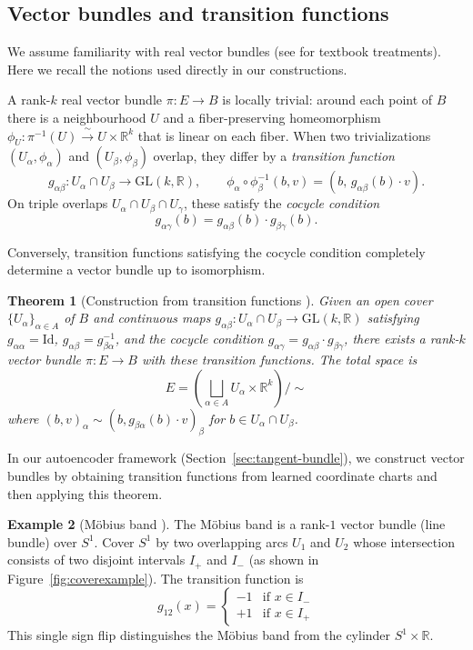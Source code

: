 \documentclass[11pt]{article}
\newcommand{\R}{\mathbb{R}}
\newcommand{\Id}{\mathrm{Id}}
\newcommand{\GL}{\mathrm{GL}}
\theoremstyle{plain}
\newtheorem{theorem}{Theorem}[section]
\theoremstyle{definition}
\newtheorem{example}[theorem]{Example}
\theoremstyle{remark}
\begin{document}
\subsection{Vector bundles and transition functions}\label{sec:vector-bundles-background}
 
We assume familiarity with real vector bundles (see \cite{milnor1974characteristic,Zakharevich2024} for textbook treatments). Here we recall the notions used directly in our constructions.
 
A rank-$k$ real vector bundle $\pi\colon E\to B$ is locally trivial: around each point of $B$ there is a neighbourhood $U$ and a fiber-preserving homeomorphism $\phi_U\colon\pi^{-1}(U)\xrightarrow{\;\sim\;} U\times\R^k$ that is linear on each fiber. When two trivializations $(U_\alpha,\phi_\alpha)$ and $(U_\beta,\phi_\beta)$ overlap, they differ by a \emph{transition function}
\[
g_{\alpha\beta}\colon U_\alpha\cap U_\beta\to\GL(k,\R), \qquad
\phi_\alpha\circ\phi_\beta^{-1}(b,v)=(b,\,g_{\alpha\beta}(b)\cdot v).
\]
On triple overlaps $U_\alpha\cap U_\beta\cap U_\gamma$, these satisfy the \emph{cocycle condition}
\[
g_{\alpha\gamma}(b)=g_{\alpha\beta}(b)\cdot g_{\beta\gamma}(b).
\]
 
Conversely, transition functions satisfying the cocycle condition completely determine a vector bundle up to isomorphism.
 
\begin{theorem}[Construction from transition functions {\cite[Example 2.19]{Zakharevich2024}}]
\label{thm:bundle-from-transitions}
Given an open cover $\{U_\alpha\}_{\alpha \in A}$ of $B$ and continuous maps 
$g_{\alpha\beta}\colon U_\alpha \cap U_\beta \to \GL(k,\R)$
satisfying $g_{\alpha\alpha}=\Id$, $g_{\alpha\beta}=g_{\beta\alpha}^{-1}$, and the cocycle condition $g_{\alpha\gamma}=g_{\alpha\beta}\cdot g_{\beta\gamma}$, there exists a rank-$k$ vector bundle $\pi \colon E \to B$ with these transition functions. The total space is
\[
E = \left( \bigsqcup_{\alpha \in A} U_\alpha \times \R^k \right)\Big/ \sim
\]
where $(b, v)_\alpha \sim (b, g_{\beta\alpha}(b) \cdot v)_\beta$ for $b \in U_\alpha \cap U_\beta$.
\end{theorem}
 
In our autoencoder framework (Section~\ref{sec:tangent-bundle}), we construct vector bundles by obtaining transition functions from learned coordinate charts and then applying this theorem.

\begin{example}[M\"obius band {\cite[Example 2.19]{Zakharevich2024}}]\label{ex:mobius-bundle}
The M\"obius band is a rank-$1$ vector bundle (line bundle) over $S^1$. Cover $S^1$ by two overlapping arcs $U_1$ and $U_2$ whose intersection consists of two disjoint intervals $I_+$ and $I_-$ (as shown in Figure~\ref{fig:coverexample}). The transition function is
\[
g_{12}(x) = \begin{cases} 
-1 & \text{if } x \in I_- \\
+1 & \text{if } x \in I_+
\end{cases}
\]
This single sign flip distinguishes the M\"obius band from the cylinder $S^1 \times \R$.
\end{example}
 
\end{document}
